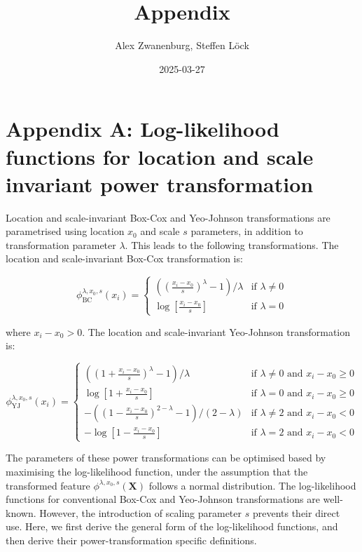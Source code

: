 \documentclass[
  a4paper,
]{article}
\title{Appendix}
\author{Alex Zwanenburg, Steffen Löck}
\date{2025-03-27}
\begin{document}
\maketitle

\section{Appendix A: Log-likelihood functions for location and scale
invariant power
transformation}\label{appendix-a-log-likelihood-functions-for-location-and-scale-invariant-power-transformation}

Location and scale-invariant Box-Cox and Yeo-Johnson transformations are
parametrised using location \(x_0\) and scale \(s\) parameters, in
addition to transformation parameter \(\lambda\). This leads to the
following transformations. The location and scale-invariant Box-Cox
transformation is:

\begin{equation}
\phi_{\text{BC}}^{\lambda, x_0, s} (x_i) = 
\begin{cases}
\left( \left(\frac{x_i - x_0}{s} \right)^\lambda - 1 \right) / \lambda & \text{if } \lambda \neq 0\\
\log\left[\frac{x_i - x_0}{s}\right] & \text{if } \lambda = 0
\end{cases}
\end{equation}

where \(x_i - x_0 > 0\). The location and scale-invariant Yeo-Johnson
transformation is:

\begin{equation}
\phi_{\text{YJ}}^{\lambda, x_0, s} (x_i) = 
\begin{cases}
\left( \left( 1 + \frac{x_i - x_0}{s}\right)^\lambda - 1\right) / \lambda & \text{if } \lambda \neq 0 \text{ and } x_i - x_0 \geq 0\\
\log\left[1 + \frac{x_i - x_0}{s}\right] & \text{if } \lambda = 0 \text{ and } x_i - x_0 \geq 0\\
-\left( \left( 1 - \frac{x_i - x_0}{s}\right)^{2 - \lambda} - 1 \right) / \left(2 - \lambda \right) & \text{if } \lambda \neq 2 \text{ and } x_i - x_0 < 0\\
-\log\left[1 - \frac{x_i - x_0}{s}\right] & \text{if } \lambda = 2 \text{ and } x_i - x_0 < 0
\end{cases}
\end{equation}

The parameters of these power transformations can be optimised based by
maximising the log-likelihood function, under the assumption that the
transformed feature \(\phi^{\lambda, x_0, s} (\mathbf{X})\) follows a
normal distribution. The log-likelihood functions for conventional
Box-Cox and Yeo-Johnson transformations are well-known. However, the
introduction of scaling parameter \(s\) prevents their direct use. Here,
we first derive the general form of the log-likelihood functions, and
then derive their power-transformation specific definitions.
\end{document}
